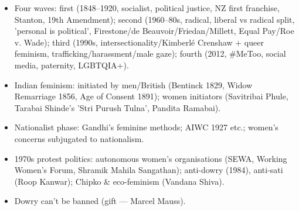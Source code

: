 \begin{QuickRevision}
\begin{itemize}
\item Four waves: first (1848--1920, socialist, political justice, NZ first franchise, Stanton, 19th Amendment); second (1960--80s, radical, liberal vs radical split, 'personal is political', Firestone/de Beauvoir/Friedan/Millett, Equal Pay/Roe v. Wade); third (1990s, intersectionality/Kimberlé Crenshaw + queer feminism, trafficking/harassment/male gaze); fourth (2012, \#MeToo, social media, paternity, LGBTQIA+).
\item Indian feminism: initiated by men/British (Bentinck 1829, Widow Remarriage 1856, Age of Consent 1891); women initiators (Savitribai Phule, Tarabai Shinde's 'Stri Purush Tulna', Pandita Ramabai).
\item Nationalist phase: Gandhi's feminine methods; AIWC 1927 etc.; women's concerns subjugated to nationalism.
\item 1970s protest politics: autonomous women's organisations (SEWA, Working Women's Forum, Shramik Mahila Sangathan); anti-dowry (1984), anti-sati (Roop Kanwar); Chipko \& eco-feminism (Vandana Shiva).
\item Dowry can't be banned (gift --- Marcel Mauss).
\end{itemize}
\end{QuickRevision}

